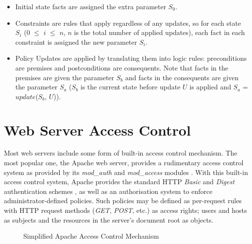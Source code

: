 \documentclass[11pt]{llncs}
\begin{document}
      \begin{itemize}
        \item
          Initial state facts are assigned the extra parameter $S_{0}$.
        \vspace{1mm}
        \item
          Constraints are rules that apply regardless of any updates, so
          for each state $S_{i}$ ($0$ $\leq$ $i$ $\leq$ $n$, $n$ is the total
          number of applied updates), each fact in each constraint is assigned
          the new parameter $S_{i}$.
        \vspace{1mm}
        \item
          Policy Updates are applied by translating them into logic rules:
          preconditions are premises and postconditions are consequents. Note
          that facts in the premises are given the parameter $S_{b}$ and
          facts in the consequents are given the parameter $S_{a}$ ($S_{b}$ is
          the current state before update $U$ is applied and $S_{a}$ =
          $update$($S_{b}$, $U$)).
      \end{itemize}

  \section{Web Server Access Control}

    Most web servers include some form of built-in access control mechanism.
    The most popular one, the Apache web server, provides a rudimentary access
    control system as provided by its {\em mod\_auth} and {\em mod\_access}
    modules \cite{AP,LAU}. With this built-in access control system, Apache
    provides the standard HTTP {\em Basic} and {\em Digest} authentication
    schemes \cite{HTTP2}, as well as an authorisation system to enforce
    administrator-defined policies. Such policies may be defined as per-request
    rules with HTTP request methods ({\em GET}, {\em POST}, etc.) \cite{HTTP1}
    as access rights; users and hosts as subjects and the resources in the
    server's document root as objects.

    \begin{figure}[ht]
      \begin{center}
        \caption{Simplified Apache Access Control Mechanism}
        \label{fig-2}
      \end{center}
    \end{figure}
\end{document}
